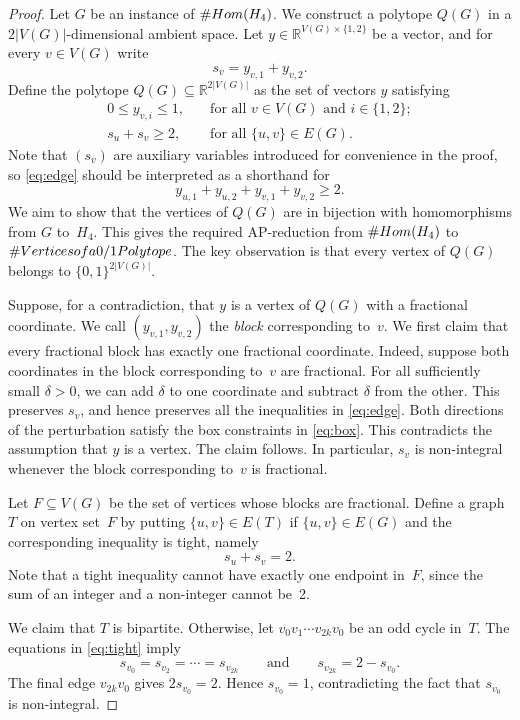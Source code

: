 \documentclass[10pt,a4paper]{amsart}
\def\Hfour{H_4}
\def\Rset{\mathbb{R}}
\newcommand{\abs}[1]{\left\vert#1\right\vert}
\def\nHom{\textsc{\#Hom}}
\def\nPolytopeVertices{\textsc{\#Vertices of a 0/1 Polytope}}
\begin{document}
\begin{proof}
Let $G$ be an instance of $\nHom(\Hfour)$.  
We construct a polytope $Q(G)$ in a $2|V(G)|$-dimensional ambient space.  Let $y\in\mathbb{R}^{V(G)\times\{1,2\}}$ be a vector,
and for every $v\in V(G)$ write
\[
 s_v=y_{v,1}+y_{v,2}.
\]
Define the polytope $Q(G)\subseteq\Rset^{2\abs{V(G)}}$ as the set of vectors $y$ satisfying
\begin{align}
 0\leq y_{v,i}\leq1, &\quad\text{for all $v\in V(G)$ and $i\in\{1,2\}$}; \label{eq:box}\\
 s_u+s_v\geq2,&\quad\text{for all $\{u,v\}\in E(G)$}. \label{eq:edge}
\end{align}
Note that $(s_v)$ are auxiliary variables introduced for convenience in the proof, so \eqref{eq:edge} should be interpreted as a shorthand for 
$$
y_{u,1}+y_{u,2}+y_{v,1}+y_{v,2}\geq2.
$$
We aim to show that the vertices of $Q(G)$ are in bijection with homomorphisms from $G$ to~$\Hfour$.  This gives the required AP-reduction from $\nHom(\Hfour)$ to $\nPolytopeVertices$.
The key observation is that every vertex of $Q(G)$ belongs to $\{0,1\}^{2\abs{V(G)}}$.

Suppose, for a contradiction, that $y$ is a vertex of $Q(G)$ with a fractional coordinate.  We call $(y_{v,1},y_{v,2})$ the \textit{block} corresponding to~$v$.
We first claim that every fractional block has exactly one fractional coordinate.  Indeed, suppose both coordinates in the block corresponding to~$v$ are fractional.  For all sufficiently small $\delta>0$, we can add $\delta$ to one coordinate and subtract $\delta$ from the other.  This preserves $s_v$, and hence preserves all the inequalities in \eqref{eq:edge}.  Both directions of the perturbation satisfy the box constraints in \eqref{eq:box}.  This contradicts the assumption that $y$ is a vertex.  The claim follows.  In particular, $s_v$ is non-integral whenever the block corresponding to~$v$ is fractional.

Let $F\subseteq V(G)$ be the set of vertices whose blocks are fractional.  Define a graph~$T$ on vertex set~$F$ by putting $\{u,v\}\in E(T)$ if $\{u,v\}\in E(G)$ and the corresponding inequality is tight, namely
\begin{equation}\label{eq:tight}
 s_u+s_v=2.
\end{equation}
Note that a tight inequality cannot have exactly one endpoint in~$F$, since the sum of an integer and a non-integer cannot be~2.

We claim that $T$ is bipartite.  Otherwise, let $v_0v_1\cdots v_{2k}v_0$ be an odd cycle in~$T$.  The equations in \eqref{eq:tight} imply
\[
 s_{v_0}=s_{v_2}=\cdots=s_{v_{2k}}
 \qquad\text{and}\qquad
 s_{v_{2k}}=2-s_{v_0}.
\]
The final edge $v_{2k}v_0$ gives $2s_{v_0}=2$.  Hence $s_{v_0}=1$, contradicting the fact that $s_{v_0}$ is non-integral.


\end{proof}
\end{document}
